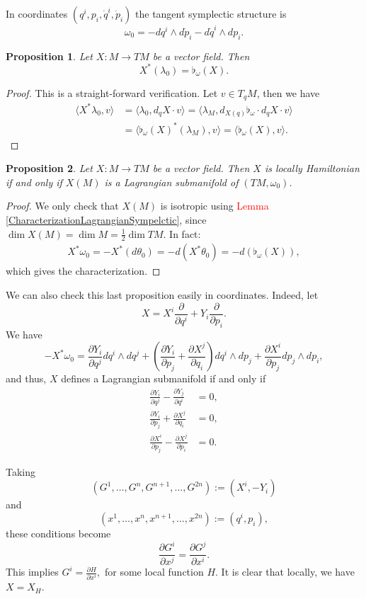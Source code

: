 \documentclass[12pt]{article}
\newtheorem{prop}{Proposition}[section]
\renewcommand{\dim}{\operatorname{dim}}
\newcommand{\partder}[2]{\frac{\partial #1}{\partial #2}}
\begin{document}
In coordinates $(q^i, p_i, \dot{q}^i, \dot{p}_i)$ the tangent symplectic structure is $$\omega_0 = -dq^i \wedge d\dot{p}_i - d\dot{q}^i \wedge dp_i.$$

\begin{prop}\label{Pullbackvectorfields} Let $X: M \rightarrow TM$ be a vector field. Then $$X^*(\lambda_0) = \flat_\omega(X).$$
\end{prop}
\begin{proof} This is a straight-forward verification. Let $v \in T_qM$, then we have
\begin{align*}
\langle X^*\lambda_0 ,v \rangle &= \langle \lambda_0,  d_qX \cdot v \rangle = \langle \lambda_M, d_{X(q)}\flat_\omega \cdot d_q X \cdot v \rangle \\
&= \langle \flat_\omega(X)^* (\lambda_M), v \rangle = \langle \flat_\omega(X), v \rangle.
\end{align*}
\end{proof}

\begin{prop} Let $X: M \rightarrow TM$ be a vector field. Then $X$ is locally Hamiltonian if and only if $X(M)$ is a Lagrangian submanifold of $(TM, \omega_0)$.
\end{prop}
\begin{proof} We only check that $X(M)$ is isotropic using \textcolor{red}{Lemma \ref{CharacterizationLagrangianSympelctic}}, since $\dim X(M) = \dim M  = \frac{1}{2} \dim TM.$ In fact:
\begin{align*}
X^*\omega_0 = -X^*(d\theta_0) = -d(X^*\theta_0) = -d(\flat_\omega(X)),
\end{align*}
which gives the characterization.
\end{proof} 

We can also check this last proposition easily in coordinates. Indeed, let $$X = X^i \partder{}{q^i} + Y_i \partder{}{p_i}.$$ We have $$-X^* \omega_0 =  \partder{Y_i}{q^j}  dq^i \wedge dq^j + \left( \partder{Y_i}{p_j} + \partder{X^j}{q_i} \right) dq^i \wedge dp_j+ \partder{X^i}{p_j} dp_j \wedge dp_i,$$
 and thus, $X$ defines a Lagrangian submanifold if and only if 
 \begin{align*}
  \partder{Y_i}{q^j} -  \partder{Y_j}{q^i}&= 0,\\
  \partder{Y_i}{p_j} + \partder{X^j}{q_i} &= 0,\\
  \partder{X^i}{p_j} - \partder{X^j}{p_i} &= 0.
 \end{align*}

 Taking $$(G^1, \dots, G^n, G^{n+1}, \dots, G^{2n}) := (X^i, -Y_i)$$ and $$(x^1, \dots, x^n, x^{n+1}, \dots, x^{2n}) := (q^i, p_i),$$ these conditions become $$\partder{G^i}{x^j} = \partder{G^j}{x^i}.$$ This implies $G^i = \displaystyle \partder{H}{x^i},$ for some local function $H$. It is clear that locally, we have $X = X_H$.
\end{document}
